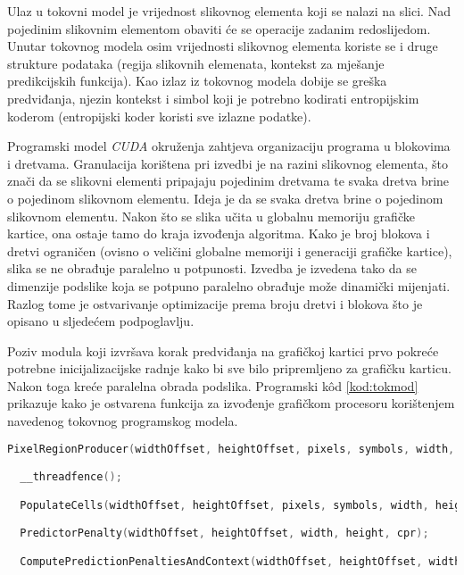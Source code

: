 \documentclass[times, utf8, zavrsni, numeric, sort]{fer}
\begin{document}
Ulaz u tokovni model je vrijednost slikovnog elementa koji se nalazi na slici. Nad pojedinim slikovnim elementom obaviti će se operacije zadanim redoslijedom. Unutar tokovnog modela osim vrijednosti slikovnog elementa koriste se i druge strukture podataka (regija slikovnih elemenata, kontekst za mješanje predikcijskih funkcija). Kao izlaz iz tokovnog modela dobije se greška predviđanja, njezin kontekst i simbol koji je potrebno kodirati entropijskim koderom (entropijski koder koristi sve izlazne podatke).

Programski model \emph{CUDA} okruženja zahtjeva organizaciju programa u blokovima i dretvama. Granulacija korištena pri izvedbi je na razini slikovnog elementa, što znači da se slikovni elementi pripajaju pojedinim dretvama te svaka dretva brine o pojedinom slikovnom elementu. Ideja je da se svaka dretva brine o pojedinom slikovnom elementu. Nakon što se slika učita u globalnu memoriju grafičke kartice, ona ostaje tamo do kraja izvođenja algoritma. Kako je broj blokova i dretvi ograničen (ovisno o veličini globalne memoriji i generaciji grafičke kartice), slika se ne obrađuje paralelno u potpunosti. Izvedba je izvedena tako da se dimenzije podslike koja se potpuno paralelno obrađuje može dinamički mijenjati. Razlog tome je ostvarivanje optimizacije prema broju dretvi i blokova što je opisano u sljedećem podpoglavlju.

Poziv modula koji izvršava korak predviđanja na grafičkoj kartici prvo pokreće potrebne inicijalizacijske radnje kako bi sve bilo pripremljeno za grafičku karticu. Nakon toga kreće paralelna obrada podslika. Programski k\^{o}d \ref{kod:tokmod} prikazuje kako je ostvarena funkcija za izvođenje grafičkom procesoru korištenjem navedenog tokovnog programskog modela.

\begin{singlespace}
\begin{lstlisting}[caption={Glavna funkcija koja se izvodi na grafičkom procesoru},label=	{kod:tokmod}, language = {C}]
 PixelRegionProducer(widthOffset, heightOffset, pixels, symbols, width, height, templsize, radius, cellsize, cpr);

  __threadfence();

  PopulateCells(widthOffset, heightOffset, pixels, symbols, width, height, templsize, radius, cellsize, cpr);

  PredictorPenalty(widthOffset, heightOffset, width, height, cpr);

  ComputePredictionPenaltiesAndContext(widthOffset, heightOffset, width, height, cellsize, cpr, symbols);
\end{lstlisting}

\end{singlespace}
\end{document}
